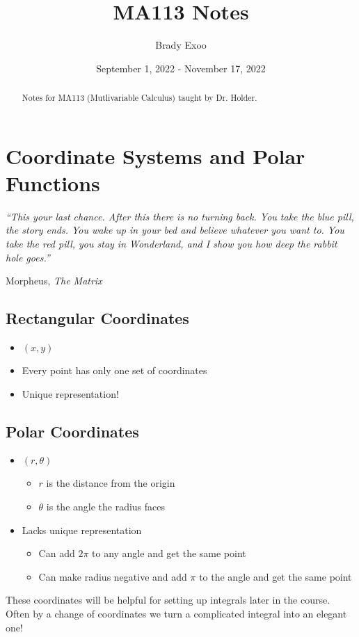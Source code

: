 \documentclass[12pt]{article}
\theoremstyle{plain} %
\theoremstyle{definition}
\theoremstyle{definition}
\theoremstyle{definition}
\theoremstyle{remark}
\begin{document}
\title{MA113 Notes}
\author{Brady Exoo}
\date{September 1, 2022 - November 17, 2022}
\maketitle

\begin{abstract}
Notes for MA113 (Mutlivariable Calculus) taught by Dr. Holder.
\end{abstract}

\tableofcontents

\eject

\section{Coordinate Systems and Polar Functions}
\epigraph{\itshape ``This your last chance. After this there is no turning back. You take the blue pill, the story ends. You wake up in your bed and believe whatever you want to. You take the red pill, you stay in Wonderland, and I show you how deep the rabbit hole goes.''}{Morpheus, \textit{The Matrix}}

\subsection{Rectangular Coordinates}
\begin{itemize}
    \item $(x,y)$
    \item Every point has only one set of coordinates
    \item Unique representation!
\end{itemize}

\subsection{Polar Coordinates}
\begin{itemize}
    \item $(r,\theta)$
    \begin{itemize}
        \item $r$ is the distance from the origin
        \item $\theta$ is the angle the radius faces
    \end{itemize}
    \item Lacks unique representation
    \begin{itemize}
        \item Can add $2\pi$ to any angle and get the same point
        \item Can make radius negative and add $\pi$ to the angle and get the same point
    \end{itemize}
\end{itemize}
These coordinates will be helpful for setting up integrals later in the course. Often by a change of coordinates we turn a complicated integral into an elegant one!
\end{document}
